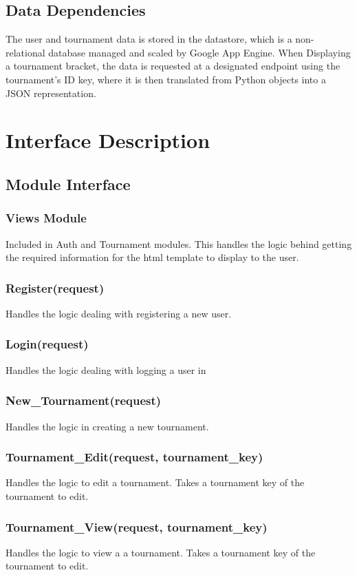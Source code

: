 \documentclass{article}
\begin{document}
\subsection{Data Dependencies}
The user and tournament data is stored in the datastore, which is a non- relational database managed and scaled by Google App Engine. When Displaying a tournament bracket, the data is requested at a designated endpoint using the tournament’s ID key, where it is then translated from Python objects into a JSON representation.



\newpage
\section{Interface Description}
\subsection{Module Interface}
\subsubsection{Views Module}
Included in Auth and Tournament modules.  This handles the logic behind getting the required information for the html template to display to the user. 
\subsubsection{Register(request)}
Handles the logic dealing with registering a new user.
\subsubsection{Login(request)}
Handles the logic dealing with logging a user in
\subsubsection{New\_Tournament(request)}
Handles the logic in creating a new tournament.
\subsubsection{Tournament\_Edit(request, tournament\_key)}
Handles the logic to edit a tournament.  Takes a tournament key of the tournament to edit. 
\subsubsection{Tournament\_View(request, tournament\_key)}
Handles the logic to view a a tournament.  Takes a tournament key of the tournament to edit.
\end{document}
